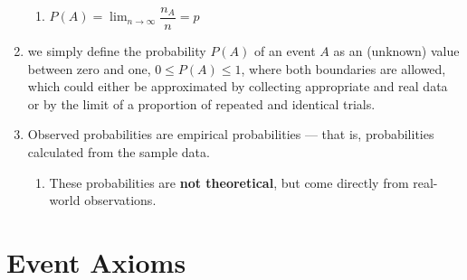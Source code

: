 \begin{enumerate}
\begin{enumerate}
        \item $P(A) =\displaystyle \lim_{n\to \infty} \dfrac{n_A}{n} = p$
        \hfill \cite{statistics/book/Statistics-for-Data-Scientists/Maurits-Kaptein}
    \end{enumerate}
    
    \item we simply define the probability $P(A)$ of an event $A$ as an (unknown) value between zero and one, $0 \leq P (A) \leq 1$, where both boundaries are allowed, which could either be approximated by collecting appropriate and real data or by the limit of a proportion of repeated and identical trials.
    \hfill \cite{statistics/book/Statistics-for-Data-Scientists/Maurits-Kaptein}

    \item 
    \begin{definition}
        Observed probabilities are empirical probabilities — that is, probabilities calculated from the sample data.
    \end{definition}
    \begin{enumerate}
        \item These probabilities are \textbf{not theoretical}, but come directly from real-world observations.
    \end{enumerate}
\end{enumerate}


\section{Event Axioms}

